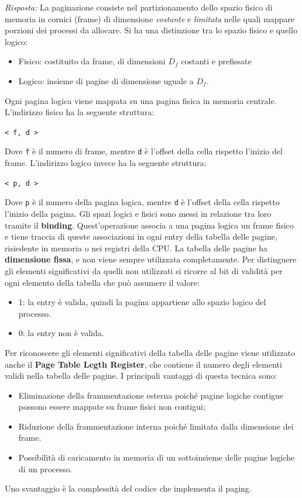 \documentclass{article}
\newenvironment{solution}
    {\textit{Risposta:}}
    {}
\begin{document}
\begin{solution}
La paginazione consiste nel partizionamento dello spazio fisico di memoria in cornici (frame) di dimensione \textit{costante} e \textit{limitata} nelle quali mappare porzioni dei processi da allocare. Si ha una distinzione tra lo spazio fisico e quello logico: 
\begin{itemize}
    \item Fisico: costituito da frame, di dimensioni $D_f$ costanti e prefissate
    \item Logico: insieme di pagine di dimensione uguale a $D_f$. 
\end{itemize}
Ogni pagina logica viene mappata su una pagina fisica in memoria centrale.
\newline
L’indirizzo fisico ha la seguente struttura:
\begin{center}
\texttt{< f, d >}
\end{center}
Dove \texttt{f} è il numero di frame, mentre \texttt{d} è l’offset della cella rispetto l’inizio del frame.
\newline
\newline
L’indirizzo logico invece ha la seguente struttura:
\begin{center}
\texttt{< p, d >}
\end{center}
Dove \texttt{p} è il numero della pagina logica, mentre \texttt{d} è l’offset della cella rispetto l’inizio della pagina.
Gli spazi logici e fisici sono messi in relazione tra loro tramite il \textbf{binding}.
\newline
Quest’operazione associa a una pagina logica un frame fisico e tiene traccia di queste associazioni in ogni entry della tabella delle pagine, risiedente in memoria o nei registri della CPU.
\newline
La tabella delle pagine ha \textbf{dimensione fissa}, e non viene sempre utilizzata completamente.
\newline
Per distinguere gli elementi significativi da quelli non utilizzati si ricorre al bit di validità per ogni elemento della tabella che può assumere il valore:
\begin{itemize}
    \item 1: la entry è valida, quindi la pagina appartiene allo spazio logico del processo.
    \item 0: la entry non è valida.
\end{itemize}
Per riconoscere gli elementi significativi della tabella delle pagine viene utilizzato anche il \textbf{Page Table Legth Register}, che contiene il numero degli elementi validi nella tabella delle pagine.
I principali vantaggi di questa tecnica sono:
\begin{itemize}
    \item Eliminazione della frammentazione esterna poiché pagine logiche contigue possono essere mappate su frame fisici non contigui;
    \item Riduzione della frammentazione interna poiché limitata dalla dimensione dei frame.
    \item Possibilità di caricamento in memoria di un sottoinsieme delle pagine logiche di un processo.
\end{itemize}
Uno svantaggio è la complessità del codice che implementa il paging.
\end{solution}
\end{document}
